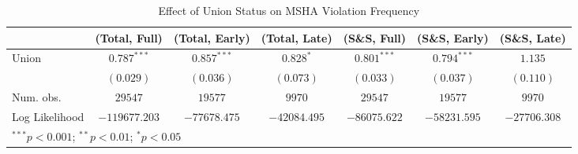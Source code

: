 
\begin{table}[H]
\begin{center}
\begin{tabular}{l c c c c c c}
\hline
 & (Total, Full) & (Total, Early) & (Total, Late) & (S\&S, Full) & (S\&S, Early) & (S\&S, Late) \\
\hline
Union          & $0.787^{***}$ & $0.857^{***}$ & $0.828^{*}$  & $0.801^{***}$ & $0.794^{***}$ & $1.135$      \\
               & $(0.029)$     & $(0.036)$     & $(0.073)$    & $(0.033)$     & $(0.037)$     & $(0.110)$    \\
\hline
Num. obs.      & $29547$       & $19577$       & $9970$       & $29547$       & $19577$       & $9970$       \\
Log Likelihood & $-119677.203$ & $-77678.475$  & $-42084.495$ & $-86075.622$  & $-58231.595$  & $-27706.308$ \\
\hline
\multicolumn{7}{l}{\scriptsize{$^{***}p<0.001$; $^{**}p<0.01$; $^{*}p<0.05$}}
\end{tabular}
\caption{Effect of Union Status on MSHA Violation Frequency}
\label{irr_100employees_violations}
\end{center}
\end{table}

